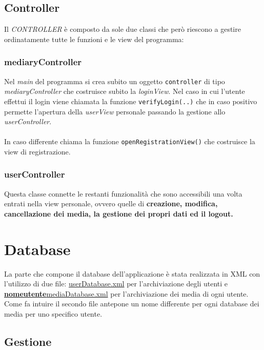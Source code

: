 \documentclass[10pt,a4paper,openany]{article}
\begin{document}
	
	\newpage
	
		\subsection{Controller}
		
		Il \emph{CONTROLLER} è composto da sole due classi che però riescono a gestire ordinatamente tutte le funzioni e le view del programma:
		
			\subsubsection{mediaryController}
			
			Nel \emph{main} del programma si crea subito un oggetto \texttt{controller} di tipo \emph{mediaryController} che costruisce subito la 
			\emph{loginView}.
			Nel caso in cui l'utente effettui il login viene chiamata la funzione \texttt{verifyLogin(..)} che in caso positivo permette l'apertura della \emph{userView}
			personale passando la gestione allo \emph{userController}.\\\\
			In caso differente chiama la funzione \texttt{openRegistrationView()} che costruisce la view di registrazione.
			
			\subsubsection{userController}
			
			Questa classe connette le restanti funzionalità che sono accessibili una volta entrati nella view personale, ovvero quelle di \textbf{creazione, modifica, 
			cancellazione dei media, la gestione dei propri dati ed il logout.}
			
\section{Database}


La parte che compone il database dell'applicazione è stata realizzata in XML con l'utilizzo di due file: \underline{userDatabase.xml} per l'archiviazione degli utenti e 
\underline{ \textbf{nomeutente}mediaDatabase.xml} per l'archiviazione dei media di ogni utente.\\
Come fa intuire il secondo file antepone un nome differente per ogni database dei media per uno specifico utente.

	\subsection{Gestione}
	
\end{document}
